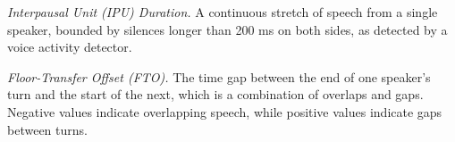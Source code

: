  \item {\it  Interpausal Unit (IPU) Duration.} A continuous stretch of speech from a single speaker, bounded by silences longer than 200 ms on both sides, as detected by a voice activity detector.

 \item  {\it  Floor-Transfer Offset (FTO).} The time gap between the end of one speaker’s turn and the start of the next, which is a combination of overlaps and gaps. Negative values indicate overlapping speech, while positive values indicate gaps between turns.

\squishend




    


